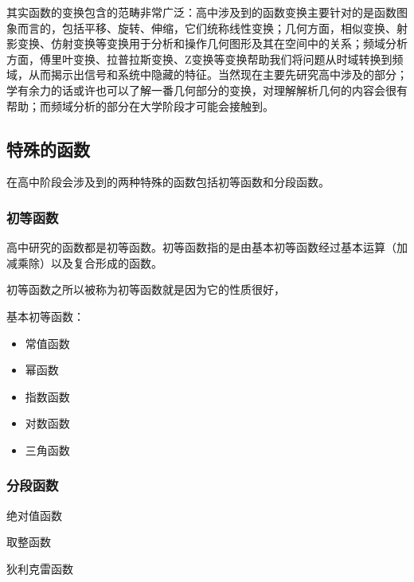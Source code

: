 

其实函数的变换包含的范畴非常广泛：高中涉及到的函数变换主要针对的是函数图象而言的，包括平移、旋转、伸缩，它们统称线性变换；几何方面，相似变换、射影变换、仿射变换等变换用于分析和操作几何图形及其在空间中的关系；频域分析方面，傅里叶变换、拉普拉斯变换、Z变换等变换帮助我们将问题从时域转换到频域，从而揭示出信号和系统中隐藏的特征。当然现在主要先研究高中涉及的部分；学有余力的话或许也可以了解一番几何部分的变换，对理解解析几何的内容会很有帮助；而频域分析的部分在大学阶段才可能会接触到。

\subsection{特殊的函数}

在高中阶段会涉及到的两种特殊的函数包括初等函数和分段函数。

\subsubsection{初等函数}

高中研究的函数都是初等函数。初等函数指的是由基本初等函数经过基本运算（加减乘除）以及复合形成的函数。

初等函数之所以被称为初等函数就是因为它的性质很好，

基本初等函数：
\begin{itemize}
\item 常值函数
\item 幂函数
\item 指数函数
\item 对数函数
\item 三角函数
\end{itemize}

\subsubsection{分段函数}

绝对值函数

取整函数

狄利克雷函数